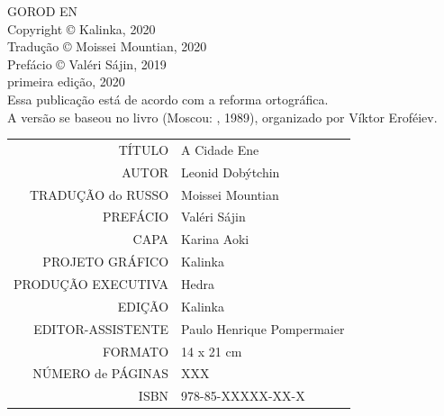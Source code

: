 \newpage
\pagestyle{empty}
\MyriadPro
\scriptsize
\begin{center}
GOROD EN\\[6pt]

Copyright © Kalinka, 2020\\[6pt]

Tradução © Moissei Mountian, 2020\\[6pt]

Prefácio © Valéri Sájin, 2019\\[6pt]

primeira edição, 2020\\[40pt]


Essa publicação está de acordo com a reforma ortográfica.\\[6pt]
A versão se baseou no livro {} (Moscou: {}, 1989), organizado por Víktor Eroféiev.\\[6pt]	
\end{center}


\bigskip

\begin{vplace}[1]
\begin{table}[ht!]
\centering
\MyriadPro\itshape
\scriptsize
\begin{tabular}{rl}
TÍTULO            & A Cidade Ene 									   \\[2pt]
AUTOR             & Leonid Dobýtchin                          		   \\[2pt]
TRADUÇÃO do RUSSO & Moissei Mountian 				                   \\[2pt]
PREFÁCIO          & Valéri Sájin	                                   \\[2pt]
CAPA              & Karina Aoki		                                   \\[2pt]
PROJETO GRÁFICO   & Kalinka                                            \\[2pt]
PRODUÇÃO EXECUTIVA & Hedra                                             \\[2pt]
EDIÇÃO            & Kalinka 		                                   \\[2pt] 
EDITOR-ASSISTENTE & Paulo Henrique Pompermaier                         \\[2pt] 
FORMATO           & 14 x 21 cm                                         \\[2pt]
NÚMERO de PÁGINAS & XXX                                                \\[2pt]
ISBN              & 978-85-XXXXX-XX-X                                 
\end{tabular}
\end{table}
\end{vplace}

